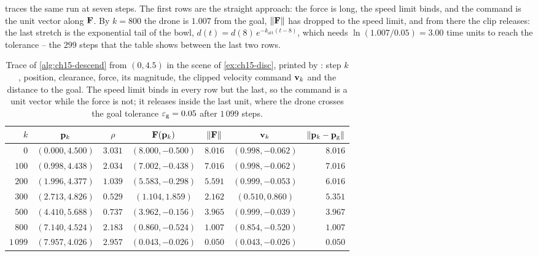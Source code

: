  traces the same run at seven steps. The first rows are
the straight approach: the force is long, the speed limit binds, and the
command is the unit vector along $\mathbf{F}$. By $k = 800$ the drone
is $1.007$ from the goal, $\left\lVert \mathbf{F} \right\rVert$ has dropped to the speed limit, and
from there the clip releases: the last stretch is the exponential tail of the
bowl, $d(t) = d(8)\,e^{-k_{\mathrm{att}}(t - 8)}$, which needs $\ln(1.007/0.05) =
3.00$ time units to reach the tolerance -- the $299$ steps that the table shows
between the last two rows.

\begin{table}[tb]
  \centering\small
  \caption{Trace of \cref{alg:ch15-descend} from $(0, 4.5)$ in the scene of
  \cref{ex:ch15-disc}, printed by : step $k$, position,
  clearance, force, its magnitude, the clipped velocity command $\mathbf{v}_k$ and
  the distance to the goal. The speed limit binds in every row but the last, so
  the command is a unit vector while the force is not; it releases inside the
  last unit, where the drone crosses the goal tolerance $\varepsilon_{\mathrm{g}} = 0.05$
  after $1\,099$ steps.}
  \label{tab:ch15-trace}
  \begin{tabular}{@{}rccccc r@{}}
  \toprule
  $k$ & $\mathbf{p}_k$ & $\rho$ & $\mathbf{F}(\mathbf{p}_k)$ & $\left\lVert \mathbf{F} \right\rVert$ & $\mathbf{v}_k$ & $\left\lVert \mathbf{p}_k - \mathbf{p}_{\mathrm{g}} \right\rVert$\\
  \midrule
  $0$      & $(0.000, 4.500)$ & $3.031$ & $(8.000, -0.500)$ & $8.016$ & $(0.998, -0.062)$ & $8.016$\\
  $100$    & $(0.998, 4.438)$ & $2.034$ & $(7.002, -0.438)$ & $7.016$ & $(0.998, -0.062)$ & $7.016$\\
  $200$    & $(1.996, 4.377)$ & $1.039$ & $(5.583, -0.298)$ & $5.591$ & $(0.999, -0.053)$ & $6.016$\\
  $300$    & $(2.713, 4.826)$ & $0.529$ & $(1.104, 1.859)$  & $2.162$ & $(0.510, 0.860)$  & $5.351$\\
  $500$    & $(4.410, 5.688)$ & $0.737$ & $(3.962, -0.156)$ & $3.965$ & $(0.999, -0.039)$ & $3.967$\\
  $800$    & $(7.140, 4.524)$ & $2.183$ & $(0.860, -0.524)$ & $1.007$ & $(0.854, -0.520)$ & $1.007$\\
  $1\,099$ & $(7.957, 4.026)$ & $2.957$ & $(0.043, -0.026)$ & $0.050$ & $(0.043, -0.026)$ & $0.050$\\
  \bottomrule
  \end{tabular}
\end{table}

